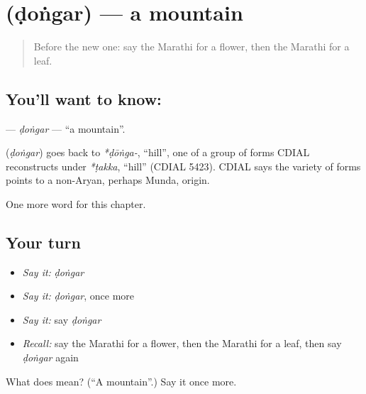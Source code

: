 \section[\texorpdfstring{\mr{डोंगर} (ḍoṅgar)}{डोंगर (ḍoṅgar)}]{ (ḍoṅgar) — a mountain}

\label{lesson:MR-C96-dongar}



\begin{quote}
Before the new one: say the Marathi for a flower, then the Marathi for a leaf.
\end{quote}

\subsection*{You'll want to know: }
\textbf{} — \emph{ḍoṅgar} — \textquotedblleft{}a mountain\textquotedblright{}.

\begin{cousinweb}
\textbf{} (\emph{ḍoṅgar}) goes back to \emph{*ḍōṅga-}, \textquotedblleft{}hill\textquotedblright{}, one of a group of forms CDIAL reconstructs under \emph{*ṭakka}, \textquotedblleft{}hill\textquotedblright{} (CDIAL 5423). CDIAL says the variety of forms points to a non-Aryan, perhaps Munda, origin.
\end{cousinweb}

\begin{grammarlens}[title={What you've built}]
One more word for this chapter.
\end{grammarlens}

\subsection*{Your turn}
\begin{itemize}
\raggedright
  \item \emph{Say it:} \emph{ḍoṅgar}
  \item \emph{Say it:} \emph{ḍoṅgar}, once more
  \item \emph{Say it:} say \emph{ḍoṅgar}
  \item \emph{Recall:} say the Marathi for a flower, then the Marathi for a leaf, then say \emph{ḍoṅgar} again
\end{itemize}

\begin{tcolorbox}[breakable,colback=teal!4,colframe=teal!35!black,title={Before you move on}]
What does  mean? (\textquotedblleft{}A mountain\textquotedblright{}.) Say it once more.
\end{tcolorbox}
